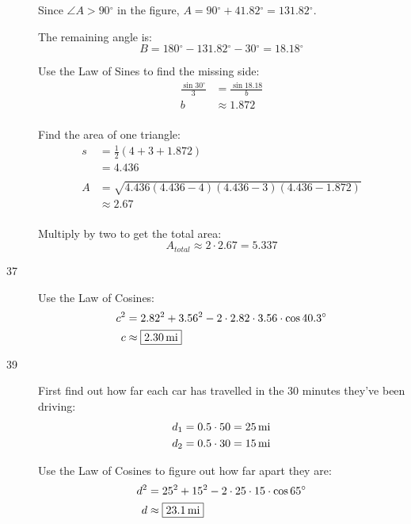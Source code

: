 \documentclass{exam}
\newcommand{\dg}{\ensuremath{^\circ}}
\begin{document}
\begin{description}
        Since $\angle A > 90 \dg$ in the figure, $A = 90 \dg + 41.82 \dg = 131.82 \dg$.

        The remaining angle is:
        \[
          B = 180 \dg - 131.82 \dg - 30 \dg = 18.18 \dg
        \]

        Use the Law of Sines to find the missing side:
        \begin{align*}
          \frac{\sin 30 \dg}{3} & = \frac{\sin 18.18}{b} \\
          b                     & \approx 1.872 \\
        \end{align*}

        Find the area of one triangle:
        \begin{align*}
          s  & = \frac{1}{2}(4 + 3 + 1.872) \\
             & = 4.436 \\
          \\
          A  & = \sqrt{4.436 (4.436 - 4)(4.436 - 3) (4.436 - 1.872)} \\
             & \approx 2.67 \\
        \end{align*}

        Multiply by two to get the total area:
        \[
          A_{total} \approx 2 \cdot 2.67 = \boxed{ 5.337 }
        \]

      \item[37]
        Use the Law of Cosines:
        \begin{align*}
          c^2 & = 2.82^2 + 3.56^2 - 2 \cdot 2.82 \cdot 3.56 \cdot \cos 40.3 \dg \\
          c   & \approx \boxed{ \unit[2.30]{mi} } \\
        \end{align*}

      \pagebreak

      \item[39]
        First find out how far each car has travelled in the 30 minutes they've been driving:
        \begin{align*}
          d_1 &= 0.5 \cdot 50 = \unit[25]{mi} \\
          d_2 &= 0.5 \cdot 30 = \unit[15]{mi} \\
        \end{align*}

        Use the Law of Cosines to figure out how far apart they are:
        \begin{align*}
          d^2 & = 25^2 + 15^2 - 2 \cdot 25 \cdot 15 \cdot \cos 65 \dg \\
          d   & \approx \boxed{ \unit[23.1]{mi} } \\
        \end{align*}


\end{description}
\end{document}
